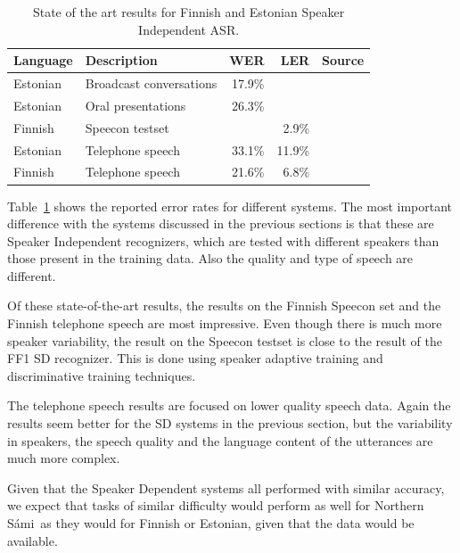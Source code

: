 \documentclass[b5paper]{article}
\newcommand{\todo}[2]{{\textcolor{red}{\bf [#1] #2 }}}
\newcommand{\ns}{Northern Sámi}
\begin{document}
\begin{table}
\centering
\begin{tabular}{llrrl}
\textbf{Language} & \textbf{Description} & \textbf{WER} & \textbf{LER} & \textbf{Source}\\\hline
Estonian & Broadcast conversations  & 17.9\% & &  \cite{alumae2014recent} \\
Estonian & Oral presentations  & 26.3\% & & \cite{alumae2014recent} \\
Finnish & Speecon testset  & & 2.9\%&  \cite{pylkkonen2012} \\
Estonian & Telephone speech &33.1\% & 11.9\% & \cite{hirsimaki2009importance}\\
Finnish & Telephone speech & 21.6\% & 6.8\% & \cite{hirsimaki2009importance}\\
\end{tabular}
\caption{State of the art results for Finnish and Estonian Speaker Independent ASR.}\label{tbl:stateoftheart}
\end{table}

Table~\ref{tbl:stateoftheart} shows the reported error rates for different systems. The most important difference with the systems discussed in the previous sections is that these are Speaker Independent recognizers, which are tested with different speakers than those present in the training data. Also the quality and type of speech are different. 

Of these state-of-the-art results, the results on the Finnish Speecon set and the Finnish telephone speech are most impressive. Even though there is much more speaker variability, the result on the Speecon testset is close to the result of the FF1 SD recognizer. This is done using speaker adaptive training and discriminative training techniques. 

The telephone speech results are focused on lower quality speech data. Again the results seem better for the SD systems in the previous section, but the variability in speakers, the speech quality and the language content of the utterances are much more complex. 

Given that the Speaker Dependent systems all performed with similar accuracy, we expect that tasks of similar difficulty would perform as well for \ns\ as they would for Finnish or Estonian, given that the data would be available.

\end{document}
